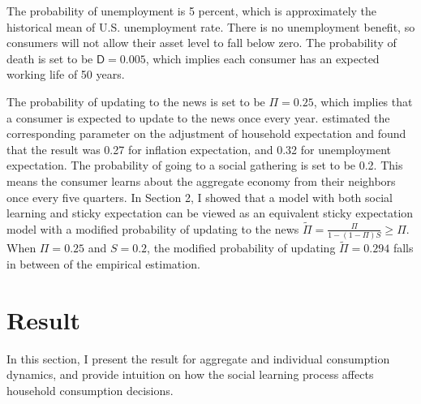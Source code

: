 \documentclass[12pt,letterpaper]{article}
\begin{document}
\par
The probability of unemployment is 5 percent, which is approximately the historical mean of U.S. unemployment rate. There is no unemployment benefit, so consumers will not allow their asset level to fall below zero. The probability of death is set to be $\mathsf{D}=0.005$, which implies each consumer has an expected working life of 50 years.
\par
The probability of updating to the news is set to be $\Pi=0.25$, which implies that a consumer is expected to update to the news once every year. \cite{Carroll2003} estimated the corresponding parameter on the adjustment of household expectation and found that the result was 0.27 for inflation expectation, and 0.32 for unemployment expectation. The probability of going to a social gathering is set to be 0.2. This means the consumer learns about the aggregate economy from their neighbors once every five quarters. In Section 2, I showed that a model with both social learning and sticky expectation can be viewed as an equivalent sticky expectation model with a modified probability of updating to the news $\tilde{\Pi}=\frac{\Pi}{1-\left(1-\Pi\right)S}\geq\Pi$. When $\Pi=0.25$ and $S=0.2$, the modified probability of updating $\tilde{\Pi}=0.294$ falls in between of the empirical estimation.
\section{Result}
In this section, I present the result for aggregate and individual consumption dynamics, and provide intuition on how the social learning process affects household consumption decisions.
\end{document}
